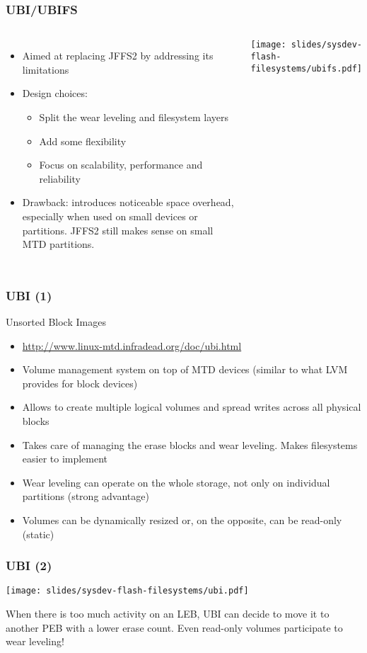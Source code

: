 \begin{frame}
  \frametitle{UBI/UBIFS}
  \begin{columns}
    \begin{itemize}
    \item Aimed at replacing JFFS2 by addressing its limitations
    \item Design choices:
      \begin{itemize}
      \item Split the wear leveling and filesystem layers
      \item Add some flexibility
      \item Focus on scalability, performance and reliability
      \end{itemize}
    \item Drawback: introduces noticeable space overhead,
      especially when used on small devices or partitions. JFFS2
      still makes sense on small MTD partitions.
    \end{itemize}
    \texttt{[image: slides/sysdev-flash-filesystems/ubifs.pdf]}
  \end{columns}
\end{frame}

\begin{frame}
  \frametitle{UBI (1)}
  Unsorted Block Images
  \begin{itemize}
  \item \url{http://www.linux-mtd.infradead.org/doc/ubi.html}
  \item Volume management system on top of MTD devices (similar to
    what LVM provides for block devices)
  \item Allows to create multiple logical volumes and spread writes
    across all physical blocks
  \item Takes care of managing the erase blocks and wear
    leveling. Makes filesystems easier to implement
  \item Wear leveling can operate on the whole storage,
    not only on individual partitions (strong advantage)
  \item Volumes can be dynamically resized or, on the opposite, can be
    read-only (static)
  \end{itemize}
\end{frame}

\begin{frame}
  \frametitle{UBI (2)}
  \begin{center}
    \texttt{[image: slides/sysdev-flash-filesystems/ubi.pdf]}
  \end{center}
  When there is too much activity on an LEB, UBI can decide to move it
  to another PEB with a lower erase count. Even read-only volumes
  participate to wear leveling!
\end{frame}

